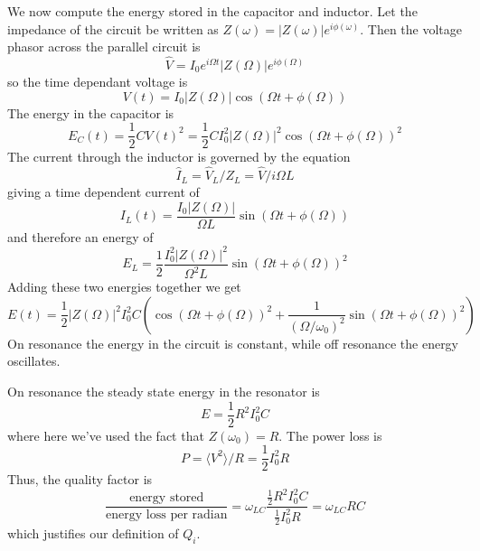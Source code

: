 \documentclass{article}
\begin{document}
We now compute the energy stored in the capacitor and inductor. Let the impedance of the circuit be written as $Z(\omega)=|Z(\omega)|e^{i\phi(\omega)}$. Then the voltage phasor across the parallel circuit is \begin{equation}
\hat{V} = I_0e^{i\Omega t}|Z(\Omega)|e^{i\phi(\Omega)} \end{equation}
so the time dependant voltage is \begin{equation}
V(t) = I_0|Z(\Omega)|\cos \left( \Omega t + \phi(\Omega) \right) \end{equation}
The energy in the capacitor is \begin{equation}
E_C(t) = \frac{1}{2} C V(t)^2 = \frac{1}{2} C I_0^2 |Z(\Omega)|^2 \cos \left( \Omega t + \phi(\Omega) \right)^2 \end{equation}
The current through the inductor is governed by the equation \begin{equation}
\hat{I}_L = \hat{V}_L / Z_L = \hat{V}/i\Omega L \end{equation}
giving a time dependent current of \begin{equation}
I_L(t) = \frac{I_0 |Z(\Omega)|}{\Omega L} \sin \left( \Omega t + \phi(\Omega) \right) \end{equation}
and therefore an energy of \begin{equation}
E_L = \frac{1}{2} \frac{I_0^2 |Z(\Omega)|^2}{\Omega^2 L} \sin \left( \Omega t + \phi(\Omega) \right)^2 \end{equation}
Adding these two energies together we get \begin{equation}
E(t) = \frac{1}{2}|Z(\Omega)|^2 I_0^2 C \left( \cos(\Omega t + \phi(\Omega))^2 + \frac{1}{(\Omega/\omega_0)^2} \sin(\Omega t + \phi(\Omega))^2 \right) \end{equation}
On resonance the energy in the circuit is constant, while off resonance the energy oscillates. 

On resonance the steady state energy in the resonator is \begin{equation}
E = \frac{1}{2}R^2 I_0^2 C \end{equation}
where here we've used the fact that $Z(\omega_0)=R$. The power loss is \begin{equation}
P = \langle V^2 \rangle /R = \frac{1}{2}I_0^2 R \end{equation}
Thus, the quality factor is \begin{equation}
\frac{\textrm{energy stored}}{\textrm{energy loss per radian}} = \omega_{LC}\frac{\frac{1}{2}R^2 I_0^2 C}{\frac{1}{2}I_0^2 R} = \omega_{LC} R C \end{equation}
which justifies our definition of $Q_i$.
\end{document}
